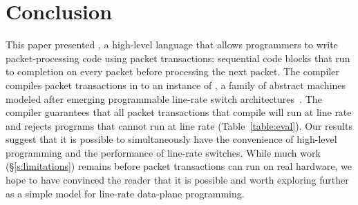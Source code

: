\section{Conclusion}
\label{s:conclusion}

This paper presented \pktlanguage, a high-level language that allows
programmers to write packet-processing code using packet transactions:
sequential code blocks that run to completion on every packet before processing
the next packet. The \pktlanguage compiler compiles packet transactions in
\pktlanguage to an instance of \absmachine, a family of abstract machines
modeled after emerging programmable line-rate switch
architectures~\cite{flexpipe, xpliant, rmt}. The compiler guarantees that all
packet transactions that compile will run at line rate and rejects \pktlanguage
programs that cannot run at line rate (Table~\ref{table:eval}). Our results
suggest that it is possible to simultaneously have the convenience of
high-level programming and the performance of line-rate switches. While much
work (\S\ref{s:limitations}) remains before packet transactions can run on real
hardware, we hope to have convinced the reader that it is possible and worth
exploring further as a simple model for line-rate data-plane programming.
